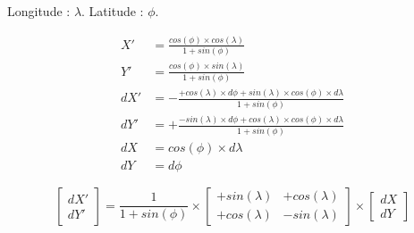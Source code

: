 \documentclass[12pt]{article}
\begin{document}
Longitude : $ \lambda $. Latitude : $ \phi $.

\begin{align*}
X' &= \frac{cos\left(\phi\right) \times cos\left(\lambda\right)}{1 + sin\left(\phi\right)} \\
Y' &= \frac{cos\left(\phi\right) \times sin\left(\lambda\right)}{1 + sin\left(\phi\right)} \\
dX' &= - \frac{+ cos\left(\lambda\right) \times d\phi + sin\left(\lambda\right) \times cos\left(\phi\right) \times d\lambda}{1 + sin\left(\phi\right)} \\
dY' &= + \frac{- sin\left(\lambda\right) \times d\phi + cos\left(\lambda\right) \times cos\left(\phi\right) \times d\lambda}{1 + sin\left(\phi\right)} \\
dX &= cos\left(\phi\right) \times d\lambda \\
dY &= d\phi 
\end{align*}


\begin{equation*}
\begin{bmatrix}
dX' \\
dY'
\end{bmatrix}
= 
\frac{1}{1 + sin\left(\phi\right)} \times
\begin{bmatrix}
+ sin\left(\lambda\right) & + cos\left(\lambda\right) \\
+ cos\left(\lambda\right) & - sin\left(\lambda\right) 
\end{bmatrix}
\times
\begin{bmatrix}
dX \\
dY
\end{bmatrix}
\end{equation*}
\end{document}

